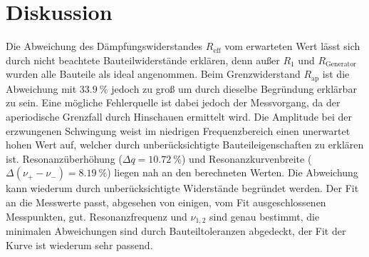 \section{Diskussion}
\label{sec:Diskussion}

Die Abweichung des Dämpfungswiderstandes $R_\text{eff}$ vom erwarteten Wert lässt sich durch nicht beachtete Bauteilwiderstände erklären, denn außer $R_1$ und $R_\text{Generator}$ wurden alle Bauteile als ideal angenommen.
Beim Grenzwiderstand $R_\text{ap}$ ist die Abweichung mit $\SI{33,9}{\%}$ jedoch zu groß um durch dieselbe Begründung erklärbar zu sein. Eine mögliche Fehlerquelle ist dabei jedoch der Messvorgang, da der aperiodische Grenzfall durch Hinschauen ermittelt wird.
Die Amplitude bei der erzwungenen Schwingung weist im niedrigen Frequenzbereich einen unerwartet hohen Wert auf, welcher durch unberücksichtigte Bauteileigenschaften zu erklären ist. Resonanzüberhöhung ($\Delta q = \SI{10,72}{\%}$) und Resonanzkurvenbreite ($\Delta(\nu_+ -\nu_-) = \SI{8,19}{\%}$) liegen nah an den berechneten Werten. Die Abweichung kann wiederum durch unberücksichtigte Widerstände begründet werden. Der Fit an die Messwerte passt, abgesehen von einigen, vom Fit ausgeschlossenen Messpunkten, gut.
Resonanzfrequenz und $\nu_{1,2}$ sind genau bestimmt, die minimalen Abweichungen sind durch Bauteiltoleranzen abgedeckt, der Fit der Kurve ist wiederum sehr passend.
